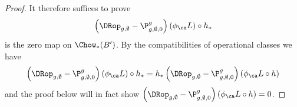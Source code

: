 \begin{proof}


It therefore suffices to prove
\begin{equation}
\left( \DRop_{g,\emptyset}-\P_{g,\emptyset,0}^g \right) (\phi_\ca L) \circ h_*
\end{equation}
is the zero map on $\Chow_*(B')$. By the compatibilities of operational classes we have
\begin{equation*}
\left( \DRop_{g,\emptyset}-\P_{g,\emptyset,0}^g \right) (\phi_\ca L) \circ h_* = h_* \left( \DRop_{g,\emptyset}-\P_{g,\emptyset,0}^g \right) (\phi_\ca L \circ h)
\end{equation*}
and the proof below will in fact show $\left( \DRop_{g,\emptyset}-\P_{g,\emptyset,0}^g \right) (\phi_\ca L \circ h)=0$.




\end{proof}
